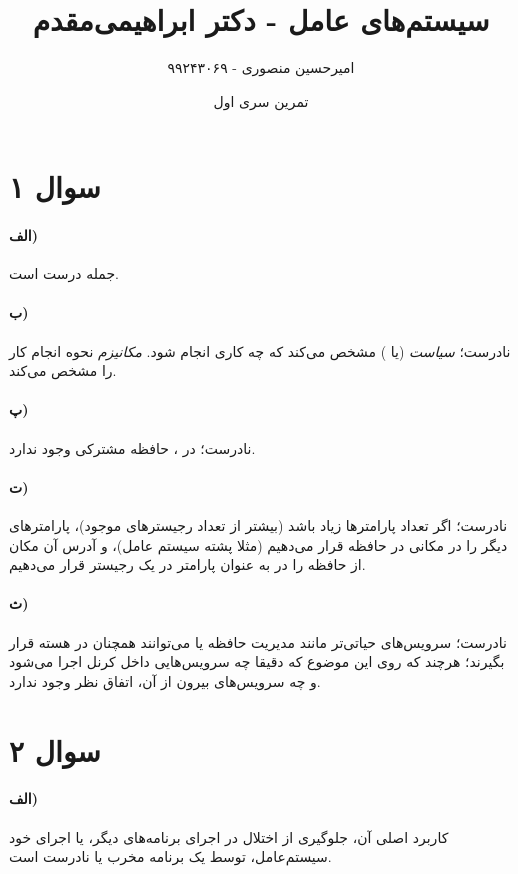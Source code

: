 \documentclass{article}
\title{سیستم‌های عامل - دکتر ابراهیمی‌مقدم}
\author{امیرحسین منصوری - ۹۹۲۴۳۰۶۹}
\date{تمرین سری اول}
\begin{document}
	\maketitle

	\section*{سوال ۱}
	\paragraph*{الف)}
	جمله درست است.

	\paragraph*{ب)}
	نادرست؛
	\textit{سیاست}
	(یا
	)
	مشخص می‌کند که چه کاری انجام شود.
	\textit{مکانیزم}
	نحوه انجام کار را مشخص می‌کند.

	\paragraph*{پ)}
	نادرست؛ در
	،
	حافظه مشترکی وجود ندارد.

	\paragraph*{ت)}
	نادرست؛ اگر تعداد پارامترها زیاد باشد (بیشتر از تعداد رجیسترهای موجود)، پارامترهای دیگر را در مکانی در حافظه قرار می‌دهیم (مثلا پشته سیستم عامل)، و آدرس آن مکان از حافظه را در به عنوان پارامتر در یک رجیستر قرار می‌دهیم.

	\paragraph*{ث)}
	نادرست؛ سرویس‌های حیاتی‌تر مانند مدیریت حافظه یا
	می‌توانند همچنان در هسته قرار بگیرند؛ هرچند که روی این موضوع که دقیقا چه سرویس‌هایی داخل کرنل اجرا می‌شود و چه سرویس‌های بیرون از آن، اتفاق نظر وجود ندارد.

	\section*{سوال ۲}

	\paragraph*{الف)}
	کاربرد اصلی آن، جلوگیری از اختلال در اجرای برنامه‌های دیگر، یا اجرای خود سیستم‌عامل، توسط یک برنامه مخرب یا نادرست است.
\end{document}
